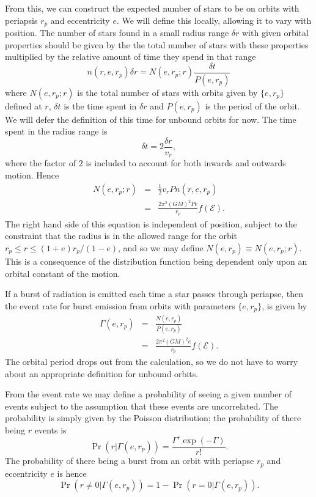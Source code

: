 \documentclass[useAMS,usedcolumn,usegraphicx,usenatbib]{mn2e}
\newcommand{\recip}[1]{\ensuremath{\frac{1}{#1}}}
\begin{document}
From this, we can construct the expected number of stars to be on orbits with periapsis $r_p$ and eccentricity $e$. We will define this locally, allowing it to vary with position. The number of stars found in a small radius range $\delta r$ with given orbital properties should be given by the the total number of stars with these properties multiplied by the relative amount of time they spend in that range
\begin{equation}
n(r, e, r_p)\delta r = N(e, r_p; r)\frac{\delta t}{P(e, r_p)}
\end{equation}
where $N(e, r_p; r)$ is the total number of stars with orbits given by $\{e, r_p\}$ defined at $r$, $\delta t$ is the time spent in $\delta r$ and $P(e, r_p)$ is the period of the orbit. We will defer the definition of this time for unbound orbits for now. The time spent in the radius range is
\begin{equation}
\delta t = 2\frac{\delta r}{v_r},
\end{equation}
where the factor of $2$ is included to account for both inwards and outwards motion. Hence
\begin{eqnarray}
N(e, r_p; r) & = & \recip{2} v_r P n(r, e, r_p)\\
 & = & \frac{2\pi^2(GM)^2 P e}{r_p}f(\mathcal{E}).
\end{eqnarray}
The right hand side of this equation is independent of position, subject to the constraint that the radius is in the allowed range for the orbit $r_p \leq r \leq (1+e)r_p/(1-e)$, and so we may define $N(e, r_p) \equiv N(e, r_p; r)$. This is a consequence of the distribution function being dependent only upon an orbital constant of the motion.

If a burst of radiation is emitted each time a star passes through periapse, then the event rate for burst emission from orbits with parameters $\{e, r_p\}$, is given by
\begin{eqnarray}
\Gamma(e, r_p) & = & \frac{N(e, r_p)}{P(e, r_p)}\\
 & = & \frac{2\pi^2(GM)^2 e}{r_p}f(\mathcal{E}).
\label{eq:Gamma}
\end{eqnarray}
The orbital period drops out from the calculation, so we do not have to worry about an appropriate definition for unbound orbits.

From the event rate we may define a probability of seeing a given number of events subject to the assumption that these events are uncorrelated. The probability is simply given by the Poisson distribution; the probability of there being $r$ events is
\begin{equation}
\Pr(r|\Gamma(e, r_p)) = \frac{\Gamma^r\exp(-\Gamma)}{r!}.
\end{equation}
The probability of there being a burst from an orbit with periapse $r_p$ and eccentricity $e$ is hence
\begin{equation}
\Pr(r \neq 0|\Gamma(e, r_p)) = 1 - \Pr(r = 0|\Gamma(e, r_p)).
\end{equation}
\end{document}
